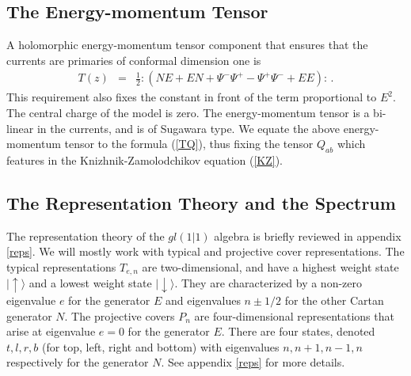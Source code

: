 \documentclass[12pt]{article}
\numberwithin{equation}{section}
\numberwithin{equation}{section}
\numberwithin{table}{section}\setlength{\multlinegap}{25pt}
\begin{document}
\subsection{The Energy-momentum Tensor}
A holomorphic energy-momentum tensor component that ensures that the currents
are primaries of conformal dimension one is  \cite{Rozansky:1992rx}
\begin{eqnarray}
T(z) &=& \frac{1}{2} : (NE + EN  +   \Psi^- \Psi^+ - \Psi^+ \Psi^- + EE) :
\, .
\end{eqnarray}
This requirement also fixes the constant in front of the term proportional to $E^2$. The central charge of the model is zero.
The energy-momentum tensor is a bi-linear in the currents, and is  of  Sugawara type.
We equate the above energy-momentum tensor to the formula (\ref{TQ}), thus fixing the tensor
$Q_{ab}$ which features in the Knizhnik-Zamolodchikov equation (\ref{KZ}).
\subsection{The Representation Theory and the Spectrum}
The representation theory of the $gl(1|1)$ algebra is briefly reviewed in appendix \ref{reps}. We will mostly work with 
typical  and projective cover representations. The typical representations $T_{e,n}$ are two-dimensional, 
and have a highest weight state $| {\uparrow} \rangle$ and a lowest weight state $|{ \downarrow} \rangle$. They are
characterized by a non-zero eigenvalue $e$ for the generator $E$ and eigenvalues $n \pm 1/2$ for the other Cartan generator $N$.
The projective covers $P_n$ are four-dimensional representations that arise at eigenvalue $e=0$ for the generator $E$.
There are four states, denoted $t,l,r,b$  (for top, left, right and bottom) with eigenvalues $n,n+1,n-1,n$ respectively for the
generator $N$. See appendix \ref{reps} for more  details.
\end{document}
